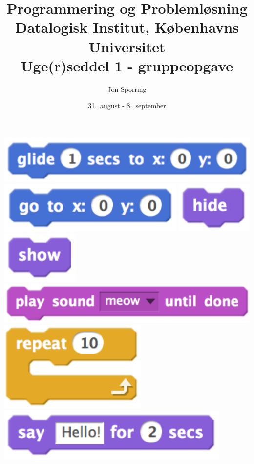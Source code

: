 \documentclass[a4paper,12pt]{article}
\title{Programmering og Problemløsning\\Datalogisk Institut,
  Københavns Universitet\\Uge(r)seddel 1 - gruppeopgave}
\author{Jon Sporring}
\date{31.\ august - 8.\ september}
\begin{document}
    \includegraphics[height=0.04\paperheight]{glide.png}
    \includegraphics[height=0.04\paperheight]{go.png}
    \includegraphics[height=0.04\paperheight]{hide.png}
    \includegraphics[height=0.04\paperheight]{show.png}
    \\\includegraphics[height=0.04\paperheight]{playSound.png}
    \includegraphics[height=0.08\paperheight]{repeat.png}
    \includegraphics[height=0.045\paperheight]{say.png}
\end{document}
